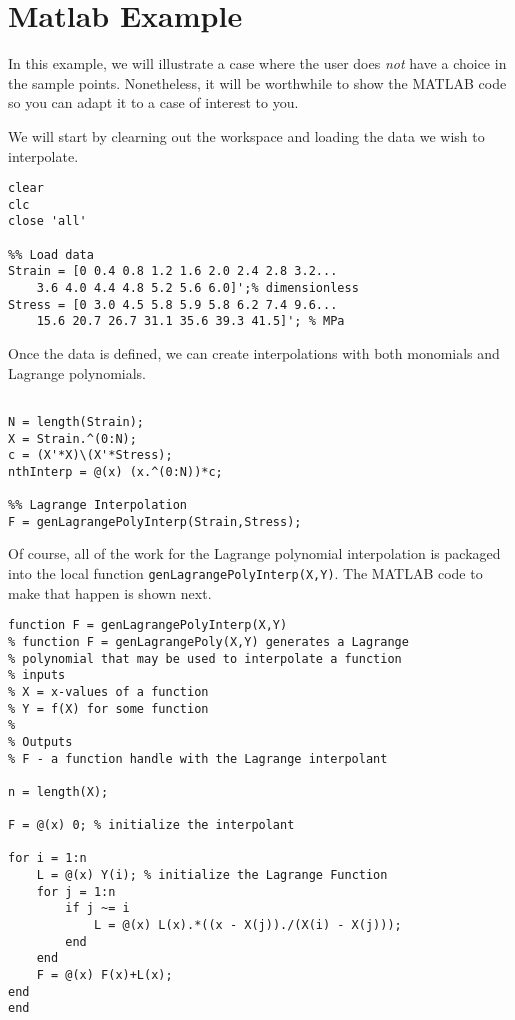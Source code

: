 \section{Matlab Example}
In this example, we will illustrate a case where the user does \emph{not} have a choice in the sample points.  Nonetheless, it will be worthwhile to show the MATLAB code so you can adapt it to a case of interest to you.

We will start by clearning out the workspace and loading the data we wish to interpolate.
\begin{lstlisting}[style=myMatlab,name=lec15n-ex2]
clear
clc
close 'all'

%% Load data
Strain = [0 0.4 0.8 1.2 1.6 2.0 2.4 2.8 3.2...
    3.6 4.0 4.4 4.8 5.2 5.6 6.0]';% dimensionless
Stress = [0 3.0 4.5 5.8 5.9 5.8 6.2 7.4 9.6...
    15.6 20.7 26.7 31.1 35.6 39.3 41.5]'; % MPa
\end{lstlisting}

Once the data is defined, we can create interpolations with both monomials and Lagrange polynomials.  

\begin{lstlisting}[style=myMatlab,name=lec15n-ex2]
%% N-th order Interpolation (monomials)

N = length(Strain);
X = Strain.^(0:N);
c = (X'*X)\(X'*Stress);
nthInterp = @(x) (x.^(0:N))*c;

%% Lagrange Interpolation
F = genLagrangePolyInterp(Strain,Stress);
\end{lstlisting}

Of course, all of the work for the Lagrange polynomial interpolation is packaged into the local function \lstinline[style=myMatlab]{genLagrangePolyInterp(X,Y)}.  The MATLAB code to make that happen is shown next.

\begin{lstlisting}[style=myMatlab,name=lec15n-ex2]
%% Local function for Lagrange polynomial
function F = genLagrangePolyInterp(X,Y)
% function F = genLagrangePoly(X,Y) generates a Lagrange  
% polynomial that may be used to interpolate a function
% inputs
% X = x-values of a function
% Y = f(X) for some function
%
% Outputs
% F - a function handle with the Lagrange interpolant

n = length(X); 

F = @(x) 0; % initialize the interpolant

for i = 1:n
    L = @(x) Y(i); % initialize the Lagrange Function
    for j = 1:n
        if j ~= i
            L = @(x) L(x).*((x - X(j))./(X(i) - X(j)));
        end
    end
    F = @(x) F(x)+L(x);
end
end
\end{lstlisting}

